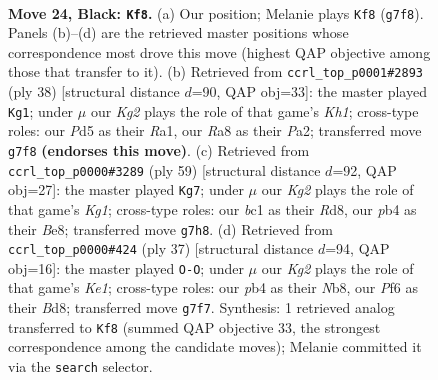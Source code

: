 \documentclass[11pt]{article}
\begin{document}
\clearpage

\begin{figure}[p]\centering
\begin{subfigure}{0.46\textwidth}\centering
\resizebox{\linewidth}{!}{%
\newchessgame
\chessboard[
  setfen={rnr5/pppbb1k1/q4p2/P2p1N2/1P1P4/4P1P1/3Q4/RNB2RK1 b - - 0 24},
  showmover=false,
  pgfstyle=straightmove, color=movearrow, markmove={g7-f8}
]}
\caption{}
\end{subfigure}\hfill
\begin{subfigure}{0.46\textwidth}\centering
\resizebox{\linewidth}{!}{%
\newchessgame
\chessboard[
  setfen={r2qr1k1/1p3ppp/4bn2/p2p4/3Q4/3P1B2/PPP1NRPP/R6K w - - 0 20},
  showmover=false,
  pgfstyle=straightmove, color=movearrow, markmove={h1-g1}
]}
\caption{}
\end{subfigure}
\\[4pt]
\begin{subfigure}{0.46\textwidth}\centering
\resizebox{\linewidth}{!}{%
\newchessgame
\chessboard[
  setfen={3rb1k1/r6p/pp1q4/1n4pB/1P1p4/3N2P1/Q2RPP1P/2R3K1 b - - 3 30},
  showmover=false,
  pgfstyle=straightmove, color=movearrow, markmove={g8-g7}
]}
\caption{}
\end{subfigure}\hfill
\begin{subfigure}{0.46\textwidth}\centering
\resizebox{\linewidth}{!}{%
\newchessgame
\chessboard[
  setfen={rn1bk2r/pp3ppp/2p5/4BqP1/3P2R1/3P1N1P/PP6/R2Q1K2 b kq - 0 19},
  showmover=false,
  pgfstyle=straightmove, color=movearrow, markmove={e8-g8}
]}
\caption{}
\end{subfigure}
\caption{\textbf{Move 24, Black: \texttt{Kf8}.} (a) Our position; Melanie plays \texttt{Kf8} (\texttt{g7f8}). Panels (b)--(d) are the retrieved master positions whose correspondence most drove this move (highest QAP objective among those that transfer to it). (b) Retrieved from \texttt{ccrl\_top\_p0001\#2893} (ply 38) [structural distance $d$=90, QAP obj=33]: the master played \texttt{Kg1}; under $\mu$ our \emph{Kg2} plays the role of that game's \emph{Kh1}; cross-type roles: our \emph{P}d5 as their \emph{R}a1, our \emph{R}a8 as their \emph{P}a2; transferred move \texttt{g7f8} \textbf{(endorses this move)}. (c) Retrieved from \texttt{ccrl\_top\_p0000\#3289} (ply 59) [structural distance $d$=92, QAP obj=27]: the master played \texttt{Kg7}; under $\mu$ our \emph{Kg2} plays the role of that game's \emph{Kg1}; cross-type roles: our \emph{b}c1 as their \emph{R}d8, our \emph{p}b4 as their \emph{B}e8; transferred move \texttt{g7h8}. (d) Retrieved from \texttt{ccrl\_top\_p0000\#424} (ply 37) [structural distance $d$=94, QAP obj=16]: the master played \texttt{O-O}; under $\mu$ our \emph{Kg2} plays the role of that game's \emph{Ke1}; cross-type roles: our \emph{p}b4 as their \emph{N}b8, our \emph{P}f6 as their \emph{B}d8; transferred move \texttt{g7f7}. Synthesis: 1 retrieved analog transferred to \texttt{Kf8} (summed QAP objective 33, the strongest correspondence among the candidate moves); Melanie committed it via the \texttt{search} selector.}
\label{fig:thought-m47}
\end{figure}
\end{document}
